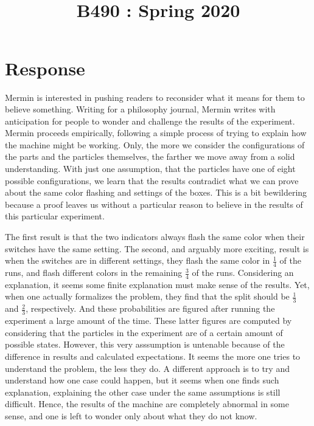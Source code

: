 \documentclass[11pt]{article}
\title{
    \vspace{2in}
    \textmd{\textbf{\tit}}\\
    \normalsize\vspace{0.1in}\small{B490 : Spring 2020 }\\
    \vspace{0.1in}\large{\textit{\auths}}
    \vspace{3in}
}
\date{}
\begin{document}
\maketitle
\pagebreak

\section{Response}


Mermin is interested in pushing readers to reconsider what it means for them to believe something.
Writing for a philosophy journal, Mermin writes with anticipation for people to wonder
and challenge the results of the experiment. Mermin proceeds empirically, following a
simple process of trying to explain how the machine might be working. Only, the more
we consider the configurations of the parts and the particles themselves, the farther
we move away from a solid understanding.
With just one assumption, that the particles have
one of eight possible configurations, we learn that the results contradict what we can
prove about the same color flashing and settings of the boxes. 
This is a bit bewildering because a proof leaves us without
a particular reason to believe in the results of this particular experiment.


The first result is that the two indicators always flash the same color when their switches have the same setting. 
The second, and arguably more exciting, result is when the switches are in different settings, they flash the same 
color in $\frac{1}{4}$ of the runs, and flash different colors in the remaining $\frac{3}{4}$ of the runs.
Considering an explanation, it seems some finite explanation must make sense of the results. Yet, when one actually
formalizes the problem, they find that the split should be $\frac{1}{3}$ and $\frac{2}{3}$, respectively. 
And these probabilities are figured after running the experiment a large amount of the time. These latter figures are 
computed by considering that the particles in the experiment are of a certain amount of possible states.
However, this very asssumption is untenable because of the difference in results and calculated expectations. 
It seems the more one tries to understand the problem, the less they do. A different approach is to try and 
understand how one case could happen, but it seems when one finds such explanation,
explaining the other case under the same assumptions is still difficult.
Hence, the results of the machine are completely abnormal 
in some sense, and one is left to wonder only about what they do not know. 
\end{document}
